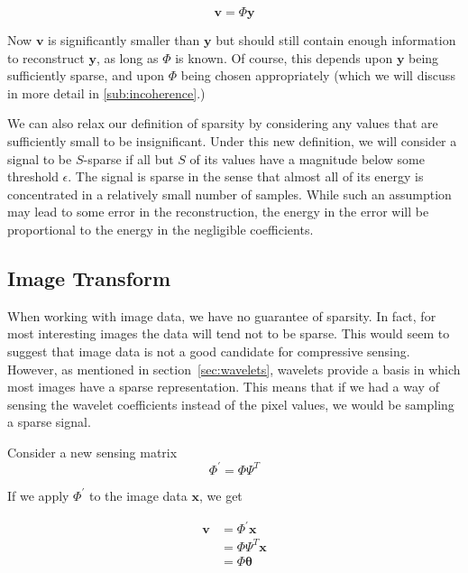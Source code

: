 \documentclass{IEEEtran}
\newcommand{\bfv}{\mathbf{v}}
\newcommand{\bfx}{\mathbf{x}}
\newcommand{\bfy}{\mathbf{y}}
\newcommand{\bftheta}{\mathbf{\theta}}
\begin{document}
\begin{equation}
  \label{eq:sense}
  \bfv = \Phi \bfy
\end{equation}

Now $\bfv$ is significantly smaller than $\bfy$ but should still contain enough information to reconstruct $\bfy$, as long as $\Phi$ is known. Of course, this depends upon $\bfy$ being sufficiently sparse, and upon $\Phi$ being chosen appropriately (which we will discuss in more detail in \ref{sub:incoherence}.)

We can also relax our definition of sparsity by considering any values that are sufficiently small to be insignificant.  Under this new definition, we will consider a signal to be $S$-sparse if all but $S$ of its values have a magnitude below some threshold $\epsilon$.  The signal is sparse in the sense that almost all of its energy is concentrated in a relatively small number of samples.  While such an assumption may lead to some error in the reconstruction, the energy in the error will be proportional to the energy in the negligible coefficients.

\subsection{Image Transform}

When working with image data, we have no guarantee of sparsity. In fact, for most interesting images the data will tend not to be sparse. This would seem to suggest that image data is not a good candidate for compressive sensing. However, as mentioned in section~\ref{sec:wavelets}, wavelets provide a basis in which most images have a sparse representation.  This means that if we had a way of sensing the wavelet coefficients instead of the pixel values, we would be sampling a sparse signal.

Consider a new sensing matrix
\begin{equation}
  \label{eq:newsense}
  \Phi^\prime = \Phi \Psi^T
\end{equation}

If we apply $\Phi^\prime$ to the image data $\bfx$, we get

\begin{equation}
  \label{eq:newsenseapplied}
  \begin{split}
  \bfv &= \Phi^\prime \bfx \\
  &= \Phi \Psi^T \bfx \\
  &= \Phi \bftheta
  \end{split}
\end{equation}
\end{document}
